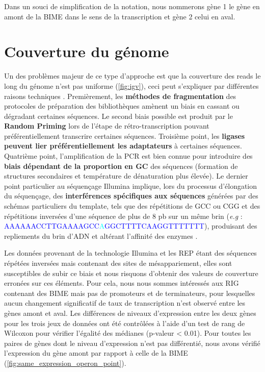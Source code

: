 \documentclass[12pt,a4paper]{report}
\begin{document}
\begin{onehalfspace}
Dans un souci de simplification de la notation, nous nommerons gène 1 le gène en amont de la BIME dans le sens de la transcription et gène 2 celui en aval.

\section*{Couverture du génome}
\label{uniformite_couverture}
Un des problèmes majeur de ce type d'approche est que la couverture des reads le long du génome n'est pas uniforme (\autoref{fig:igv}), ceci peut s'expliquer par différentes raisons techniques \citep{Li2013}. Premièrement, les \textbf{méthodes de fragmentation} des protocoles de préparation des bibliothèques amènent un biais en cassant ou dégradant certaines séquences. Le second biais possible est produit par le \textbf{Random Priming} lors de l'étape de rétro-transcription pouvant préférentiellement transcrire certaines séquences. Troisième point, les \textbf{ligases peuvent lier préférentiellement les adaptateurs} à certaines séquences. Quatrième point, l'amplification de la PCR est bien connue pour introduire des \textbf{biais dépendant de la proportion en GC} des séquences (formation de structures secondaires et température de dénaturation plus élevée). Le dernier point particulier au séquençage Illumina implique, lors du processus d'élongation du séquençage, des \textbf{interférences spécifiques aux séquences} générées par des schémas particuliers du template, tels que des répétitions de GCC ou CGG et des répétitions inversées d'une séquence de plus de 8 pb sur un même brin (\textit{e.g} : \textcolor{blue}{AAAAAACCTTGAAAAGCC}\textcolor{cyan}{A}\textcolor{blue}{GGCTTTTCAAGGTTTTTTT}), produisant des repliements du brin d'ADN et altérant l'affinité des enzymes \citep{Nakamura2011}. 

Les données provenant de la technologie Illumina et les REP étant des séquences répétées inversées mais contenant des sites de mésappariement, elles sont susceptibles de subir ce biais et nous risquons d'obtenir des valeurs de couverture erronées sur ces éléments. Pour cela, nous nous sommes intéressés aux RIG contenant des BIME mais pas de promoteurs et de terminateurs, pour lesquelles aucun changement significatif de taux de transcription n'est observé entre les gènes amont et aval. Les  différences de niveaux d'expression entre les deux gènes pour les trois jeux de données ont été contrôlées à l'aide d'un test de rang de Wilcoxon pour vérifier l'égalité des médianes (p-valeur < 0.01). Pour toutes les paires de gènes dont le niveau d'expression n'est pas différentié, nous avons vérifié l'expression du gène amont par rapport à celle de la BIME (\autoref{fig:same_expression_operon_point}).


\end{onehalfspace}
\end{document}
